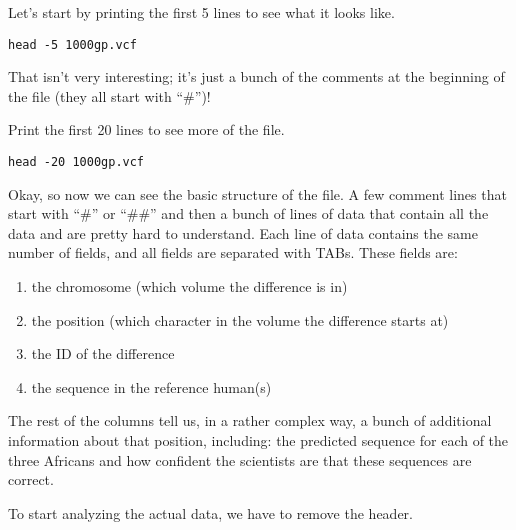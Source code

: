 \begin{steps}
Let's start by printing the first 5 lines to see what it looks like.
\begin{lstlisting}
head -5 1000gp.vcf
\end{lstlisting}
\end{steps}

\begin{note}
That isn't very interesting; it's just a bunch of the comments at the beginning of the file (they all start with ``#'')! 
\end{note}

\begin{steps}
Print the first 20 lines to see more of the file.
\begin{lstlisting}
head -20 1000gp.vcf
\end{lstlisting}
\end{steps}

\begin{note}
Okay, so now we can see the basic structure of the file. A few comment lines that start with ``#'' or ``##'' and then a bunch of lines of data that contain all the data and are pretty hard to understand. Each line of data contains the same number of fields, and all fields are separated with TABs. These fields are:
\begin{enumerate}[style=multiline,labelindent=0cm,align=left,leftmargin=0.5cm]
\item the chromosome (which volume the difference is in)
\item the position (which character in the volume the difference starts at)
\item the ID of the difference
\item the sequence in the reference human(s)
\end{enumerate}
The rest of the columns tell us, in a rather complex way, a bunch of additional information about that position, including: the predicted sequence for each of the three Africans and how confident the scientists are that these sequences are correct.

To start analyzing the actual data, we have to remove the header.
\end{note}


